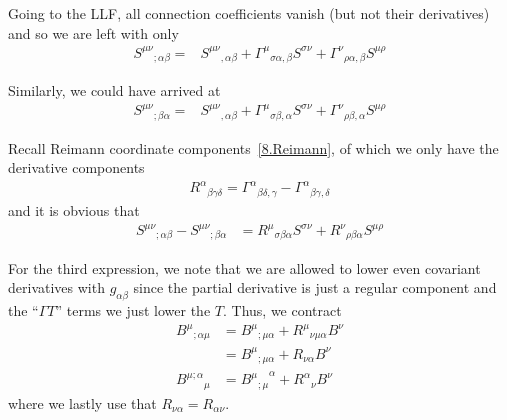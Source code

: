 \documentclass[12pt]{report}
\begin{document}
\begin{description}
        Going to the LLF, all connection coefficients vanish (but not their
        derivatives) and so we are left with only
        \begin{align*}
            {S^{\mu\nu}}_{;\alpha\beta} {}=& {S^{\mu\nu}}_{,\alpha\beta} +
                {\Gamma^\mu}_{\sigma\alpha,\beta}S^{\sigma\nu} +
                {\Gamma^\nu}_{\rho\alpha,\beta}S^{\mu\rho}
        \end{align*}

        Similarly, we could have arrived at
        \begin{align*}
            {S^{\mu\nu}}_{;\beta\alpha} {}=& {S^{\mu\nu}}_{,\alpha\beta} +
                {\Gamma^\mu}_{\sigma\beta,\alpha}S^{\sigma\nu} +
                {\Gamma^\nu}_{\rho\beta,\alpha}S^{\mu\rho}
        \end{align*}

        Recall Reimann coordinate components~\eqref{8.Reimann}, of which we
        only have the derivative components
        \begin{align*}
            {R^\alpha}_{\beta\gamma\delta} =
                {\Gamma^\alpha}_{\beta\delta,\gamma} -
                {\Gamma^\alpha}_{\beta\gamma,\delta}
        \end{align*}
        and it is obvious that
        \begin{align*}
            {S^{\mu\nu}}_{;\alpha\beta} - {S^{\mu\nu}}_{;\beta\alpha} &=
                {R^\mu}_{\sigma\beta\alpha}S^{\sigma\nu} +
                {R^\nu}_{\rho\beta\alpha}S^{\mu\rho}
        \end{align*}

        For the third expression, we note that we are allowed to lower
        even covariant derivatives with $g_{\alpha\beta}$ since the
        partial derivative is just a regular component and the ``$\Gamma T$''
        terms we just lower the $T$. Thus, we contract
        \begin{align*}
            {B^\mu}_{;\alpha\mu} &= {B^\mu}_{;\mu\alpha} +
                {R^\mu}_{\nu\mu\alpha} B^\nu\\
                &= {B^\mu}_{;\mu\alpha} +
                R_{\nu\alpha} B^\nu\\
            {B^{\mu;\alpha}}_\mu &= {{B^\mu}_{;\mu}}^\alpha +
                {R^\alpha}_\nu B^\nu
        \end{align*}
        where we lastly use that $R_{\nu\alpha} = R_{\alpha\nu}$.
\end{description}
\end{document}

